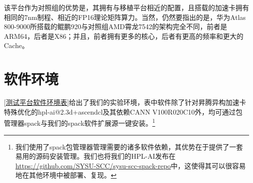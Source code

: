 该平台作为对照组的优势是，其拥有与移植平台相近的配置，且搭载的加速卡拥有相同的7nm制程、相近的FP16理论矩阵算力。当然，仍然要指出的是，华为Atlas 800-9000所搭载的鲲鹏920与对照组AMD霄龙7542的架构完全不同，前者是ARM64，后者是X86；并且，前者拥有更多的核心，后者有更高的频率和更大的Cache。

\section{软件环境}

\autoref{测试平台软件环境表}给出了我们的实验环境，表中软件除了针对昇腾异构加速卡特殊优化的hpl-ai@2.3d+ascendcl及其依赖CANN V100R020C10外，均可通过包管理器spack\cite{2015The}与我们的spack软件扩展源一键安装。\footnote{我们使用了spack包管理器管理需要的诸多软件依赖，其优势在于提供了一套易用的源码安装管理。我们也将我们的HPL-AI发布在\url{https://github.com/SYSU-SCC/sysu-scc-spack-repo}中，这使得其可以很容易地在其他环境中被部署、复现。}

